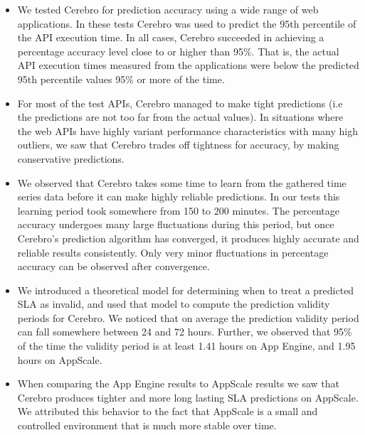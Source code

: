 \begin{itemize}
\item We tested Cerebro for prediction accuracy using a wide range of web applications. In these tests Cerebro was used to
predict the 95th percentile of the API execution time. In all cases, Cerebro succeeded in achieving a percentage
accuracy level close to or higher than 95\%. That is, the actual API execution times measured from the 
applications were below the predicted 95th percentile values 95\% or more of the time.
\item For most of the test APIs, Cerebro managed to make tight predictions (i.e the predictions are not too far
from the actual values). In situations where the web APIs have highly variant performance characteristics with many high outliers,
we saw that Cerebro trades off tightness for accuracy, by making conservative predictions.
\item We observed that Cerebro takes some time to learn from the gathered time series data before it can make highly reliable
predictions. In our tests this learning period took somewhere from 150 to 200 minutes. The percentage accuracy undergoes
many large fluctuations during this period, but once Cerebro's prediction algorithm has converged, it produces highly
accurate and reliable results consistently. Only very minor fluctuations in percentage accuracy can be observed after
convergence.
\item We introduced a theoretical model for determining when to treat a predicted SLA as invalid, and used that model
to compute the prediction validity periods for Cerebro. We noticed that on average the prediction validity period
can fall somewhere between 24 and 72 hours. Further, we observed that 95\% of the time the validity period is at least 1.41 hours
on App Engine, and 1.95 hours on AppScale.
\item When comparing the App Engine results to AppScale results we saw that Cerebro produces tighter and
more long lasting SLA predictions on AppScale. We attributed this behavior to the fact that AppScale is a small and controlled
environment that is much more stable over time. %
\end{itemize}